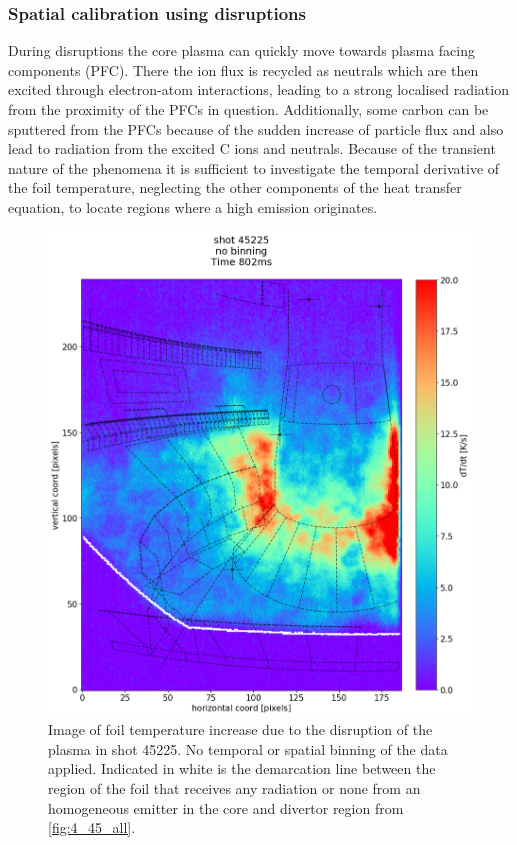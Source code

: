 \subsubsection{Spatial calibration using disruptions}

During disruptions the core plasma can quickly move towards plasma facing components (PFC). There the ion flux is recycled as neutrals which are then excited through electron-atom interactions, leading to a strong localised radiation from the proximity of the PFCs in question. Additionally, some carbon can be sputtered from the PFCs because of the sudden increase of particle flux and also lead to radiation from the excited C ions and neutrals. Because of the transient nature of the phenomena it is sufficient to investigate the temporal derivative of the foil temperature, neglecting the other components of the heat transfer equation, to locate regions where a high emission originates. %

\begin{figure}
	\centering
	\includegraphics[width=0.65\linewidth,trim={0 0 0 80},clip]{Chapters/chapter2/figs/IRVB-MASTU_shot-45225_export_5.png}
	\caption{Image of foil temperature increase due to the disruption of the plasma in shot 45225. No temporal or spatial binning of the data applied. Indicated in white is the demarcation line between the region of the foil that receives any radiation or none from an homogeneous emitter in the core and divertor region from \autoref{fig:4_45_all}.}
	\label{fig:disruption}
\end{figure}


